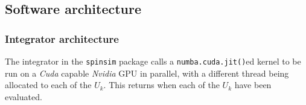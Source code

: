 \documentclass{jors}
\begin{document}

			

			
			

	\subsection{Software architecture}
		\subsubsection{Integrator architecture}
			The integrator in the \texttt{spinsim} package calls a \texttt{numba.cuda.jit()}ed kernel to be run on a \emph{Cuda} capable \emph{Nvidia} GPU in parallel, with a different thread being allocated to each of the \(U_k\). This returns when each of the \(U_k\) have been evaluated.
			
\end{document}
